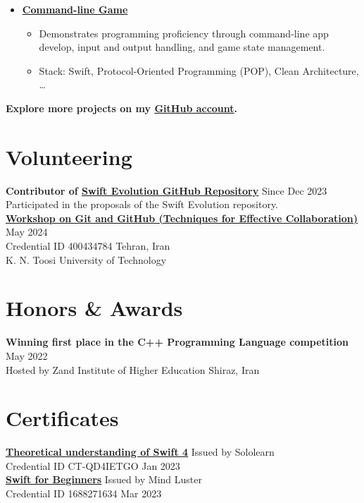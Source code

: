 \documentclass[letter,12pt]{article}
\newcommand{\customsquare}{\raisebox{0.25ex}{\scalebox{0.45}{$\blacksquare$}}}
\begin{document}
\begin{itemize}[label={\customsquare}]
    \item \href{https://github.com/nsswifter/CommandLineGame}{\underline{\textbf{Command-line Game}}}
    \begin{itemize}
        \item Demonstrates programming proficiency through command-line app develop, input and output handling, and game state management.
        \item Stack: Swift, Protocol-Oriented Programming (POP), Clean Architecture, …
    \end{itemize}
\end{itemize}

\small \textbf{Explore more projects on my \href{https://github.com/nsswifter}{\underline{GitHub account}}.}

\section*{Volunteering}
\textbf{Contributor of \href{https://github.com/swiftlang/swift-evolution}{\underline{\textbf{Swift Evolution GitHub Repository}}}} \hfill Since Dec 2023 \\ [5pt]
Participated in the proposals of the Swift Evolution repository. \\ [15pt]
\href{https://github.com/nsswifter/CV/blob/main/Assets/certificate-of-workshop-participation-karami-mehdi.pdf}{\underline{\textbf{Workshop on Git and GitHub (Techniques for Effective Collaboration)}}} \hfill May 2024 \\ [5pt]
Credential ID 400434784 \hfill Tehran, Iran \\ [5pt]
K. N. Toosi University of Technology

\pagebreak

\section*{Honors \& Awards}
\noindent
\textbf{Winning first place in the C++ Programming Language competition} \hfill May 2022 \\ [5pt]
Hosted by Zand Institute of Higher Education \hfill Shiraz, Iran

\vspace{5mm} %

\section*{Certificates}
\noindent
\href{https://www.sololearn.com/certificate/CT-QD4IETGO/png}{\underline{\textbf{Theoretical understanding of Swift 4}}} \hfill Issued by Sololearn \\ [5pt]
Credential ID CT-QD4IETGO \hfill Jan 2023 \\ [15pt]
\href{https://www.mindluster.com/storage/cer/1688271634.jpg}{\underline{\textbf{Swift for Beginners}}} \hfill Issued by Mind Luster \\ [5pt]
Credential ID 1688271634 \hfill Mar 2023
\end{document}
